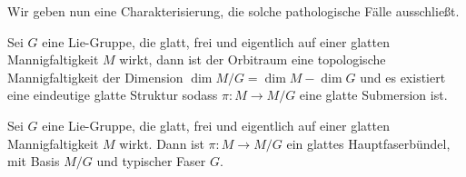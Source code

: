 Wir geben nun eine Charakterisierung, die solche pathologische
Fälle ausschließt.
\begin{theorem}
Sei $G$ eine Lie-Gruppe, die glatt, frei und eigentlich auf einer glatten
Mannigfaltigkeit $M$ wirkt, dann ist der Orbitraum eine topologische
Mannigfaltigkeit der Dimension $\dim M/G=\dim M -\dim G$ und es existiert eine
eindeutige glatte Struktur sodass $\pi:M\to  M/G$ eine glatte Submersion ist.
\end{theorem}
\begin{korollar}
Sei $G$ eine Lie-Gruppe, die glatt, frei und eigentlich auf einer glatten
Mannigfaltigkeit $M$ wirkt. Dann ist $\pi:M\to M/G$ ein glattes Hauptfaserbündel,
mit Basis $M/G$ und typischer Faser $G$.
\end{korollar}
